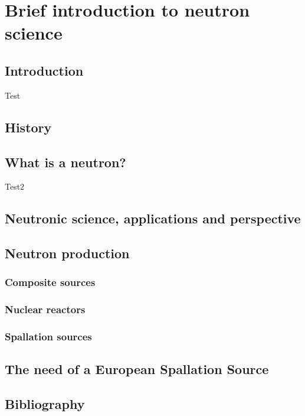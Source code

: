 \chapter{Brief introduction to neutron science}
\cleardoublepage

\minitoc

\section{Introduction}
\begin{refsection}
	\label{ch1:Introduction}
	Test \cite{Mason2005}

	\section{History}

	\section{What is a neutron?}
	\label{ch1:s:Neutron}
	Test2 \cite{osti_656719}


	\section{Neutronic science, applications and perspective}

  
  \section{Neutron production}
  \subsection{Composite sources}
  \subsection{Nuclear reactors}
  \subsection{Spallation sources}

	\section{The need of a European Spallation Source}
	\label{ch1:Summary}

	\cleardoublepage
	\section{Bibliography}
	\label{ch1:bib}
	\printbibliography[heading=subbibliography]
\end{refsection}